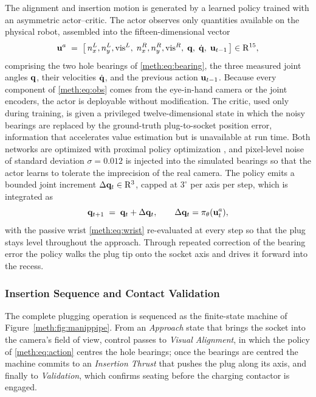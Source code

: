 The alignment and insertion motion is generated by a learned policy trained with an asymmetric actor--critic. The actor observes only quantities available on the physical robot, assembled into the fifteen-dimensional vector
\begin{equation}
  \mathbf{u}^{a} \;=\; \big[\,n^{L}_x, n^{L}_y, \mathrm{vis}^{L},\; n^{R}_x, n^{R}_y, \mathrm{vis}^{R},\; \mathbf{q},\; \dot{\mathbf{q}},\; \mathbf{u}_{t-1}\,\big] \in \mathrm{R}^{15},
  \label{meth:eq:obs}
\end{equation}
comprising the two hole bearings of \eqref{meth:eq:bearing}, the three measured joint angles $\mathbf{q}$, their velocities $\dot{\mathbf{q}}$, and the previous action $\mathbf{u}_{t-1}$. Because every component of \eqref{meth:eq:obs} comes from the eye-in-hand camera or the joint encoders, the actor is deployable without modification. The critic, used only during training, is given a privileged twelve-dimensional state in which the noisy bearings are replaced by the ground-truth plug-to-socket position error, information that accelerates value estimation but is unavailable at run time. Both networks are optimized with proximal policy optimization \cite{schulman_2017_ppo}, and pixel-level noise of standard deviation $\sigma = 0.012$ is injected into the simulated bearings so that the actor learns to tolerate the imprecision of the real camera. The policy emits a bounded joint increment $\Delta\mathbf{q}_t \in \mathrm{R}^3$, capped at $\ensuremath{3^{\circ}}$ per axis per step, which is integrated as
\begin{equation}
  \mathbf{q}_{t+1} \;=\; \mathbf{q}_t + \Delta\mathbf{q}_t, \qquad \Delta\mathbf{q}_t = \pi_\theta(\mathbf{u}^{a}_t),
  \label{meth:eq:action}
\end{equation}
with the passive wrist \eqref{meth:eq:wrist} re-evaluated at every step so that the plug stays level throughout the approach. Through repeated correction of the bearing error the policy walks the plug tip onto the socket axis and drives it forward into the recess.

\subsubsection{Insertion Sequence and Contact Validation}\label{meth:sec:manip:fsm}

The complete plugging operation is sequenced as the finite-state machine of Figure~\ref{meth:fig:manippipe}. From an \emph{Approach} state that brings the socket into the camera's field of view, control passes to \emph{Visual Alignment}, in which the policy of \eqref{meth:eq:action} centres the hole bearings; once the bearings are centred the machine commits to an \emph{Insertion Thrust} that pushes the plug along its axis, and finally to \emph{Validation}, which confirms seating before the charging contactor is engaged.

